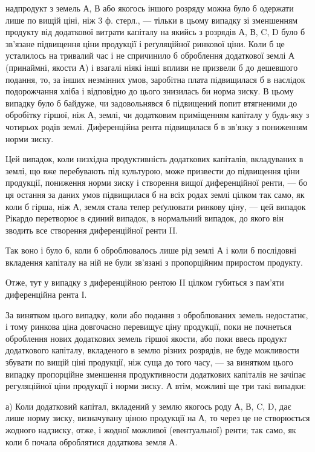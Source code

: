 \parcont{}  %
надпродукт з земель А, В або якогось іншого розряду можна було б одержати
лише по вищій ціні, ніж 3 ф. стерл., — тільки в цьому випадку зі зменшенням
продукту від додаткової витрати капіталу на якийсь з розрядів А, В, C, D
було б зв’язане підвищення ціни продукції і реґуляційної ринкової ціни.
Коли б це усталилось на тривалий час і не спричинило б оброблення додаткової
землі А (принаймні, якости А) і взагалі ніякі інші впливи не призвели б
до дешевшого подання, то, за інших незмінних умов, заробітна плата підвищилася б
в наслідок подорожчання хліба і відповідно до цього знизилась би норма зиску.
В цьому випадку було б байдуже, чи задовольнявся б підвищений попит втягненими
до обробітку гіршої, ніж А, землі, чи додатковим приміщенням капіталу
у будь-яку з чотирьох родів землі. Диференційна рента підвищилася б в зв’язку
з пониженням норми зиску.

Цей випадок, коли низхідна продуктивність додаткових капіталів, вкладуваних
в землі, що вже перебувають під культурою, може призвести до підвищення
ціни продукції, пониження норми зиску і створення вищої диференційної
ренти, — бо ця остання за даних умов підвищилася б на всіх родах землі
цілком так само, як коли б гірша, ніж А, земля стала тепер реґулювати ринкову
ціну, — цей випадок Рікардо перетворює в єдиний випадок, в нормальний
випадок, до якого він зводить все створення диференційної ренти II.

Так воно і було б, коли б оброблювалось лише рід землі А і коли б послідовні
вкладення капіталу на ній не були зв’язані з пропорційним приростом
продукту.

Отже, тут у випадку з диференційною рентою II цілком губиться з пам’яти
диференційна рента І.

За винятком цього випадку, коли або подання з оброблюваних земель
недостатнє, і тому ринкова ціна довгочасно перевищує ціну продукції, поки не
почнеться оброблення нових додаткових земель гіршої якости, або поки ввесь продукт
додаткового капіталу, вкладеного в землю різних розрядів, не буде можливости
збувати по вищій ціні продукції, ніж суща до того часу, — за винятком
цього випадку пропорційне зменшення продуктивности додаткових капіталів не
зачіпає регуляційної ціни продукції і норми зиску. А втім, можливі ще три
такі випадки:

а) Коли додатковий капітал, вкладений у землю якогось роду А, В, C, D,
дає лише норму зиску, визначувану ціною продукції на А, то через це не
створюється жодного надзиску, отже, і жодної можливої (евентуальної) ренти;
так само, як коли б почала оброблятися додаткова земля А.

